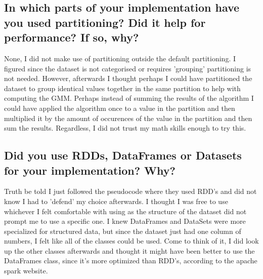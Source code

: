 \documentclass{article}
\begin{document}
\subsection{
	In which parts of your implementation have you used partitioning? Did it help for
	performance? If so, why?
}
None, I did not make use of partitioning outside the default partitioning.
I figured since the dataset is not categorised or requires 'grouping' partitioning is not needed.
However, afterwards I thought perhaps I could have partitioned the dataset to group identical values together in the same partition to help with computing the GMM.
Perhaps instead of summing the results of the algorithm I could have applied the algorithm once to a value in the partition and then multiplied it by the amount of occurences of the value in the partition and then sum the results. Regardless, I did not trust my math skills enough to try this.
\subsection{
	Did you use RDDs, DataFrames or Datasets for your implementation? Why?
}
Truth be told I just followed the pseudocode where they used RDD's and did not know I had to 'defend' my choice afterwards. I thought I was free to use whichever I felt comfortable with using as the structure of the dataset did not prompt me to use a specific one.
I knew DataFrames and DataSets were more specialized for structured data, but since the dataset just had one column of numbers, I felt like all of the classes could be used.
Come to think of it, I did look up the other classes afterwards and thought it might have been better to use the DataFrames class, since it's more optimized than RDD's, according to the apache spark website.
\end{document}
